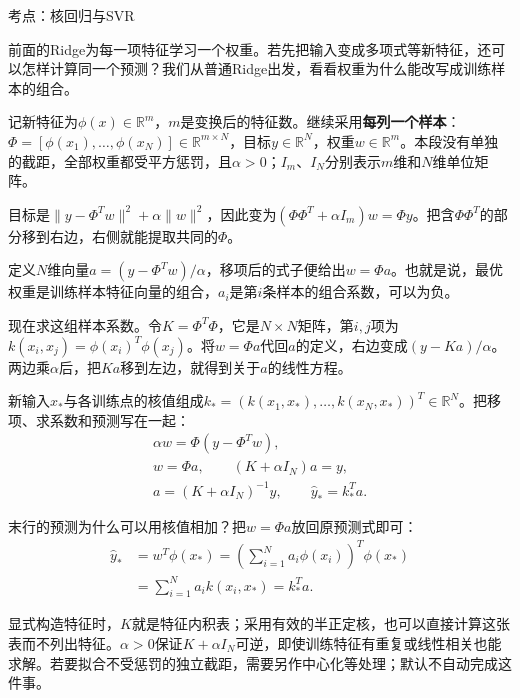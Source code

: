 考点：核回归与SVR

前面的Ridge为每一项特征学习一个权重。若先把输入变成多项式等新特征，还可以怎样计算同一个预测？我们从普通Ridge出发，看看权重为什么能改写成训练样本的组合。


记新特征为\(\phi(x)\in\mathbb R^m\)，\(m\)是变换后的特征数。继续采用\textbf{每列一个样本}：\(\Phi=[\phi(x_1),\ldots,\phi(x_N)]\in\mathbb R^{m\times N}\)，目标\(y\in\mathbb R^N\)，权重\(w\in\mathbb R^m\)。本段没有单独的截距，全部权重都受平方惩罚，且\(\alpha>0\)；\(I_m\)、\(I_N\)分别表示\(m\)维和\(N\)维单位矩阵。


目标是\(\|y-\Phi^Tw\|^2+\alpha\|w\|^2\)，因此变为\((\Phi\Phi^T+\alpha I_m)w=\Phi y\)。把含\(\Phi\Phi^T\)的部分移到右边，右侧就能提取共同的\(\Phi\)。


定义\(N\)维向量\(a=(y-\Phi^Tw)/\alpha\)，移项后的式子便给出\(w=\Phi a\)。也就是说，最优权重是训练样本特征向量的组合，\(a_i\)是第\(i\)条样本的组合系数，可以为负。


现在求这组样本系数。令\(K=\Phi^T\Phi\)，它是\(N\times N\)矩阵，第\(i,j\)项为\(k(x_i,x_j)=\phi(x_i)^T\phi(x_j)\)。将\(w=\Phi a\)代回\(a\)的定义，右边变成\((y-Ka)/\alpha\)。两边乘\(\alpha\)后，把\(Ka\)移到左边，就得到关于\(a\)的线性方程。


新输入\(x_*\)与各训练点的核值组成\(k_*=(k(x_1,x_*),\ldots,k(x_N,x_*))^T\in\mathbb R^N\)。把移项、求系数和预测写在一起：
\[
\begin{gathered}
\alpha w=\Phi(y-\Phi^Tw),\\[4pt]
w=\Phi a,\qquad (K+\alpha I_N)a=y,\\[4pt]
a=(K+\alpha I_N)^{-1}y,\qquad \hat y_*=k_*^Ta.
\end{gathered}\tag{4.16}
\]


末行的预测为什么可以用核值相加？把\(w=\Phi a\)放回原预测式即可：
\[
\begin{aligned}
\hat y_*&=w^T\phi(x_*)
 =\left(\sum_{i=1}^N a_i\phi(x_i)\right)^T\phi(x_*)\\
&=\sum_{i=1}^N a_i k(x_i,x_*)=k_*^Ta.
\end{aligned}\tag{4.16a}
\]


显式构造特征时，\(K\)就是特征内积表；采用有效的半正定核，也可以直接计算这张表而不列出特征。\(\alpha>0\)保证\(K+\alpha I_N\)可逆，即使训练特征有重复或线性相关也能求解。若要拟合不受惩罚的独立截距，需要另作中心化等处理；默认不自动完成这件事。


